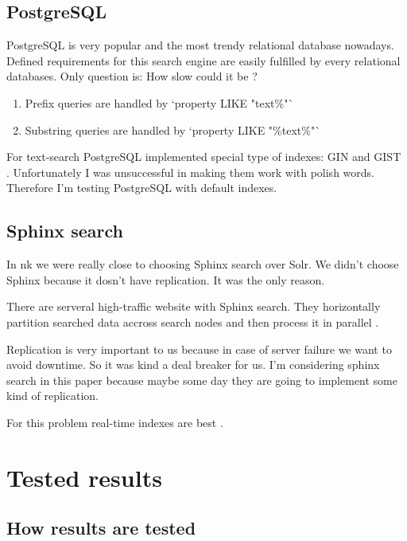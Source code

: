 \documentclass[10pt,a4paper]{article}
\begin{document}
\subsection{PostgreSQL}

PostgreSQL is very popular and the most trendy relational database nowadays. Defined requirements for this search engine are easily fulfilled by every relational databases. Only question is: How slow could it be ?

\begin{enumerate}
\item Prefix queries are handled by `property LIKE "text\%"`
\item Substring queries are handled by `property LIKE "\%text\%"`
\end{enumerate}

For text-search PostgreSQL implemented special type of indexes: GIN \cite{PSQLGIN} and GIST \cite{PSQLGIST}. Unfortunately I was unsuccessful in making them work with polish words. Therefore I'm testing PostgreSQL with default indexes.

\subsection{Sphinx search}

In nk we were really close to choosing Sphinx search over Solr. We didn't choose Sphinx because it dosn't have replication. It was the only reason.

There are serveral high-traffic website with Sphinx search. They horizontally partition searched data accross search nodes and then process it in parallel \cite{SPHINXPARAL}.

Replication is very important to us because in case of server failure we want to avoid downtime. So it was kind a deal breaker for us. I'm considering sphinx search in this paper because maybe some day they are going to implement some kind of replication.

For this problem real-time indexes are best \cite{SPHINXRT}.

\section{Tested results}

\subsection{How results are tested}
\end{document}
